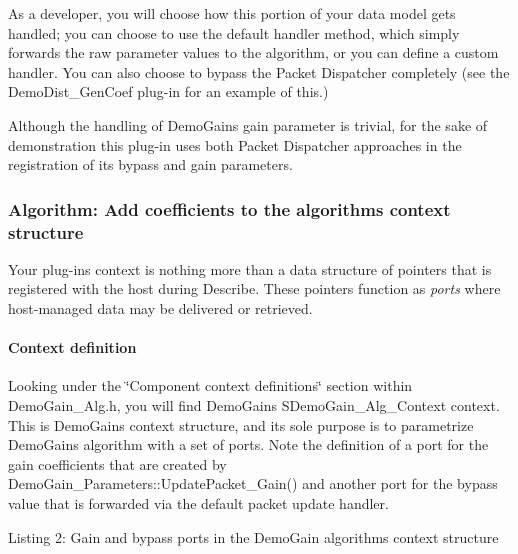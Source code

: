 As a developer, you will choose how this portion of your data model gets handled; you can choose to use the default handler method, which simply forwards the raw parameter values to the algorithm, or you can define a custom handler. You can also choose to bypass the Packet Dispatcher completely (see the {\ttfamily Demo\+Dist\+\_\+\+Gen\+Coef} plug-\/in for an example of this.)

Although the handling of Demo\+Gain\textquotesingle{}s gain parameter is trivial, for the sake of demonstration this plug-\/in uses both Packet Dispatcher approaches in the registration of its bypass and gain parameters.

\hypertarget{a00794_subsection__algorithm_add_coefficients_to_the_algorithms_context_structure}{}\subsubsection{Algorithm\+: Add coefficients to the algorithm\textquotesingle{}s context structure}\label{a00794_subsection__algorithm_add_coefficients_to_the_algorithms_context_structure}
 Your plug-\/in\textquotesingle{}s context is nothing more than a data structure of pointers that is registered with the host during Describe. These pointers function as {\itshape  ports} where host-\/managed data may be delivered or retrieved.

\hypertarget{a00794_subsubsection__context_definition_}{}\paragraph{Context definition}\label{a00794_subsubsection__context_definition_}


 Looking under the \char`\"{}\+Component context definitions\char`\"{} section within Demo\+Gain\+\_\+\+Alg.\+h, you will find Demo\+Gain\textquotesingle{}s {\ttfamily S\+Demo\+Gain\+\_\+\+Alg\+\_\+\+Context} context. This is Demo\+Gain\textquotesingle{}s context structure, and its sole purpose is to parametrize Demo\+Gain\textquotesingle{}s algorithm with a set of ports. Note the definition of a port for the gain coefficients that are created by {\ttfamily Demo\+Gain\+\_\+\+Parameters\+::\+Update\+Packet\+\_\+\+Gain()} and another port for the bypass value that is forwarded via the default packet update handler.




\begin{DoxyCode}{0}
\end{DoxyCode}
  Listing 2\+: Gain and bypass ports in the Demo\+Gain algorithm\textquotesingle{}s context structure

